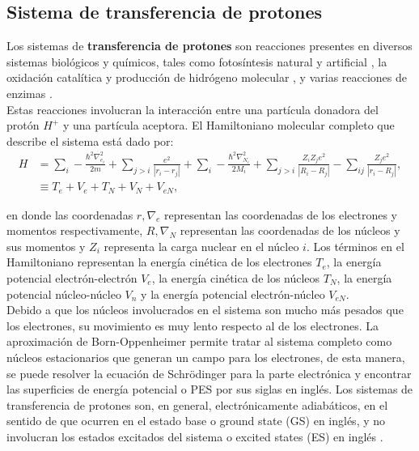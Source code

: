 \subsection{Sistema de transferencia de protones}\label{sec:ProtonTransfer}

Los sistemas de \textbf{transferencia de protones} son reacciones presentes en diversos sistemas biológicos y químicos, tales como fotosíntesis natural y artificial \cite{Hoganson1997, AlstrumAcevedo2005}, la oxidación catalítica y producción de hidrógeno molecular \cite{DuBois2011}, y varias reacciones de enzimas \cite{Stubbe2003, Knapp2002}.\\

Estas reacciones involucran la interacción entre una partícula donadora del protón $H^+$ y una partícula aceptora. El Hamiltoniano molecular completo que describe el sistema está dado por:
\begin{align*}
  H &= \sum_i - \frac{\hbar^2 \nabla^2_{e_i}}{2m} + \sum_{j>i} \frac{e^2}{|r_i-r_j|} + \sum_i - \frac{\hbar^2 \nabla^2_{N_i}}{2M_i} + \sum_{j>i} \frac{Z_iZ_je^2}{|R_i-R_j|} - \sum_{ij} \frac{Z_je^2}{|r_i-R_j|}, \\
  & \equiv T_e + V_e + T_N + V_N + V_{eN},
\end{align*}

\noindent en donde las coordenadas $r, \nabla_e$ representan las coordenadas de los electrones y momentos respectivamente, $R,\nabla_N$ representan las coordenadas de los núcleos y sus momentos y $Z_i$ representa la carga nuclear en el núcleo $i$. Los términos en el Hamiltoniano representan la energía cinética de los electrones $T_e$, la energía potencial electrón-electrón $V_e$, la energía cinética de los núcleos $T_N$, la energía potencial núcleo-núcleo $V_n$ y la energía potencial electrón-núcleo $V_{eN}$. \\

Debido a que los núcleos involucrados en el sistema son mucho más pesados que los electrones, su movimiento es muy lento respecto al de los electrones. La aproximación de Born-Oppenheimer \cite{Born1927, LPauling1935} permite tratar al sistema completo como núcleos estacionarios que generan un campo para los electrones, de esta manera, se puede resolver la ecuación de Schrödinger para la parte electrónica y encontrar las superficies de energía potencial o PES por sus siglas en inglés. Los sistemas de transferencia de protones son, en general, electrónicamente adiabáticos, en el sentido de que ocurren en el estado base o ground state (GS) en inglés, y no involucran los estados excitados del sistema o excited states (ES) en inglés \cite{Enzymes}. \\

